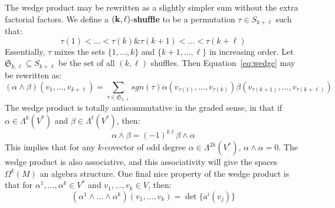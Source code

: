 \documentclass[11pt, oneside]{article}   	%
\theoremstyle{definition}
\begin{document}
The wedge product may be rewritten as a slightly simpler sum without the extra factorial factors. We define a 
$\bf{(k, \ell)}$-\textbf{shuffle} to be a permutation $\tau\in S_{k + \ell}$ such that:
\begin{equation}
	\tau(1) < ... < \tau(k) \& \tau(k + 1) < ... < \tau(k + \ell)
\end{equation}
Essentially, $\tau$ mixes the sets $\{1, ..., k\}$ and $\{k + 1, ..., \ell\}$ in increasing order. Let $\mathfrak S_{k, \ell}\subseteq
S_{k + \ell}$ be the set of all $(k, \ell)$ shuffles. Then Equation~\ref{eq:wedge} may be rewritten as:
\begin{equation}
	(\alpha\wedge\beta)(v_1, ..., v_{k + \ell}) = \sum_{\tau\in\mathfrak S_{k, \ell}}sgn(\tau)\alpha(v_{\tau(1)}, ..., v_{\tau(k)})
	\beta(v_{\tau(k + 1)}, ..., v_{\tau(k + \ell)})
\end{equation}
The wedge product is totally anticommutative in the graded sense, in that if $\alpha\in\Lambda^k(V^*)$ and $\beta\in
\Lambda^\ell(V^*)$, then:
\begin{equation}
	\alpha\wedge\beta = (-1)^{k\ell}\beta\wedge\alpha
\end{equation}
This implies that for any $k$-covector of odd degree $\alpha\in\Lambda^{2k}(V^*)$, $\alpha\wedge\alpha = 0$. The wedge 
product is also associative, and this associativity will give the spaces $\Omega^k(M)$ an algebra structure. One final nice 
property of the wedge product is that for $\alpha^1, ..., \alpha^k\in V^*$ and $v_1, ..., v_k\in V$, then:
\begin{equation}
	(\alpha^1\wedge ...\wedge\alpha^k)(v_1, ..., v_k) = \det\{a^i(v_j)\}
\end{equation}
\end{document}
